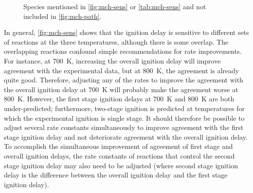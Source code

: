 \documentclass[../main.tex]{subfiles}
\begin{document}
\begin{figure}\CenterFloatBoxes
    \begin{floatrow}
            {\caption{Sensitivity of the ignition delay to various reaction rates
                for Mix \#1 ($\phi=\num{1.0}$), \SI{25.5}{\bar} and three temperatures
                (\SIlist{700;800;900}{\kelvin}). At \SI{700}{\kelvin}, the sensitivity of the overall
                ignition delay is in red and the sensitivity of the first stage
                ignition delay is in blue. At \SI{800}{\kelvin}, the sensitivity of the overall
                ignition delay is in grey and the sensitivity of the first stage
                ignition delay is in green. At \SI{900}{\kelvin}, the sensitivity of the overall
                ignition delay is in black. Numbers in parentheses represent the
                ranking of the first stage sensitivity indices.}
            \label{fig:mch-sens}}
            {\caption{Species mentioned in \cref{fig:mch-sens} or
                \cref{tab:mch-sens} and not included in \cref{fig:mch-path}.}
            \label{fig:mch-species}}
    \end{floatrow}
\end{figure}

In general, \cref{fig:mch-sens} shows that the ignition delay
is sensitive to different sets of reactions at the three
temperatures, although there is some overlap. The overlapping
reactions confound simple recommendations for rate improvements.
For instance, at \SI{700}{\kelvin}, increasing the overall ignition
delay will improve agreement with the experimental data, but at
\SI{800}{\kelvin}, the agreement is already quite good. Therefore,
adjusting any of the rates to improve the agreement with the overall
ignition delay at \SI{700}{\kelvin} will probably make the agreement
worse at \SI{800}{\kelvin}. However, the first stage ignition delays
at \SI{700}{\kelvin} and \SI{800}{\kelvin} are both under-predicted;
furthermore, two-stage ignition is predicted at temperatures for
which the experimental ignition is single stage. It should therefore
be possible to adjust several rate constants simultaneously to improve
agreement with the first stage ignition delay and not deteriorate
agreement with the overall ignition delay. To accomplish the
simultaneous improvement of agreement of first stage and overall
ignition delays, the rate constants of reactions that control the
second stage ignition delay may also need to be adjusted (where
second stage ignition delay is the difference between the overall
ignition delay and the first stage ignition delay).
\end{document}
